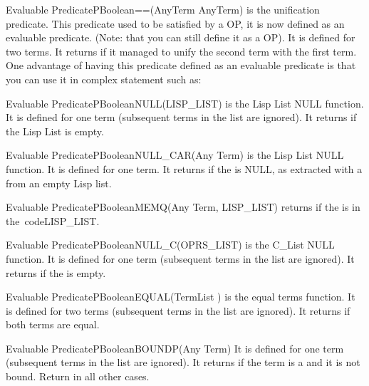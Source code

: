 \begin{typeep}{Evaluable Predicate}{PBoolean}{==}{(AnyTerm AnyTerm)}
is the unification predicate.  This predicate used to be satisfied by a OP, it
is now defined as an evaluable predicate. (Note: that you can still define it
as a OP). It is defined for two terms. It returns  if it managed to
unify the second term with the first term. One advantage of having this
predicate defined as an evaluable predicate is that you can use it in complex
statement such as: 
\end{typeep}

\begin{typeep}{Evaluable Predicate}{PBoolean}{NULL}{(LISP\_LIST)}
is the Lisp List NULL function. It is defined for one term (subsequent terms in
the list are ignored). It returns  if the Lisp List is empty.
\end{typeep}

\begin{typeep}{Evaluable Predicate}{PBoolean}{NULL\_CAR}{(Any Term)}
is the Lisp List NULL function. It is defined for one term. It returns
 if the  is NULL, as extracted with a  from an
empty Lisp list.
\end{typeep}

\begin{typeep}{Evaluable Predicate}{PBoolean}{MEMQ}{(Any Term, LISP\_LIST)}
returns
 if the  is in the\ code{LISP\_LIST}.
\end{typeep}

\begin{typeep}{Evaluable Predicate}{PBoolean}{NULL\_C}{(OPRS\_LIST)}
is the C\_List NULL function. It is defined for one term (subsequent terms in
the list are ignored). It returns  if the  is empty. 
\end{typeep}

\begin{typeep}{Evaluable Predicate}{PBoolean}{EQUAL}{(TermList )}
is the equal terms function. It is defined for two terms (subsequent terms
in the list are ignored). It returns  if both terms are equal.
\end{typeep}

\begin{typeep}{Evaluable Predicate}{PBoolean}{BOUNDP}{(Any Term)}
It is defined for one term (subsequent terms in the list are ignored). It
returns  if the term is a  and it is not bound.
Return  in all other cases.
\end{typeep}

